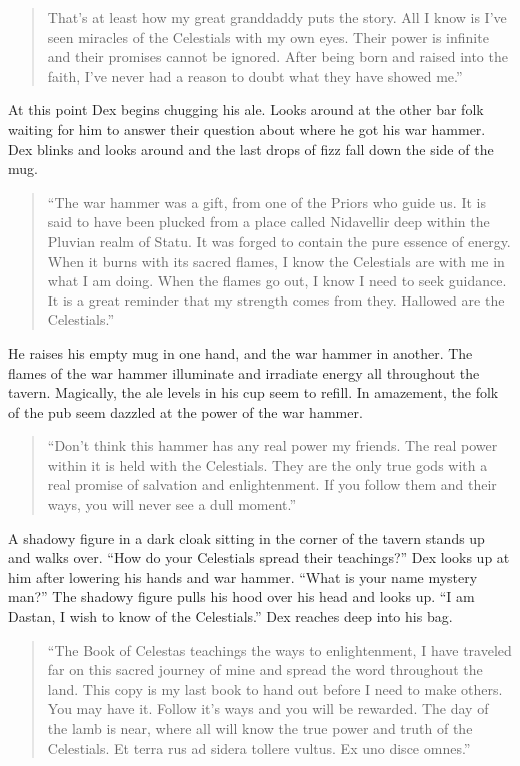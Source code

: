 \documentclass[letterpaper,10pt,twoside,twocolumn,openany]{book}
\begin{document}
\begin{quote}
	That's at least how my great granddaddy puts the story. All I know is I've seen miracles of the Celestials with my own eyes. Their power is infinite and their promises cannot be ignored. After being born and raised into the faith, I've never had a reason to doubt what they have showed me.''
\end{quote}

At this point Dex begins chugging his ale. Looks around at the other bar folk waiting for him to answer their question about where he got his war hammer. Dex blinks and looks around and the last drops of fizz fall down the side of the mug.

\begin{quote}
	``The war hammer was a gift, from one of the Priors who guide us. It is said to have been plucked from a place called Nidavellir deep within the Pluvian realm of Statu. It was forged to contain the pure essence of energy. When it burns with its sacred flames, I know the Celestials are with me in what I am doing. When the flames go out, I know I need to seek guidance. It is a great reminder that my strength comes from they. Hallowed are the Celestials.''
\end{quote}

He raises his empty mug in one hand, and the war hammer in another. The flames of the war hammer illuminate and irradiate energy all throughout the tavern. Magically, the ale levels in his cup seem to refill. In amazement, the folk of the pub seem dazzled at the power of the war hammer.

\begin{quote}
	``Don't think this hammer has any real power my friends. The real power within it is held with the Celestials. They are the only true gods with a real promise of salvation and enlightenment. If you follow them and their ways, you will never see a dull moment.''
\end{quote}

A shadowy figure in a dark cloak sitting in the corner of the tavern stands up and walks over. ``How do your Celestials spread their teachings?'' Dex looks up at him after lowering his hands and war hammer. ``What is your name mystery man?'' The shadowy figure pulls his hood over his head and looks up. ``I am Dastan, I wish to know of the Celestials.'' Dex reaches deep into his bag.

\begin{quote}
	``The Book of Celestas teachings the ways to enlightenment, I have traveled far on this sacred journey of mine and spread the word throughout the land. This copy is my last book to hand out before I need to make others. You may have it. Follow it's ways and you will be rewarded. The day of the lamb is near, where all will know the true power and truth of the Celestials. Et terra rus ad sidera tollere vultus. Ex uno disce omnes.''
\end{quote}
\end{document}
